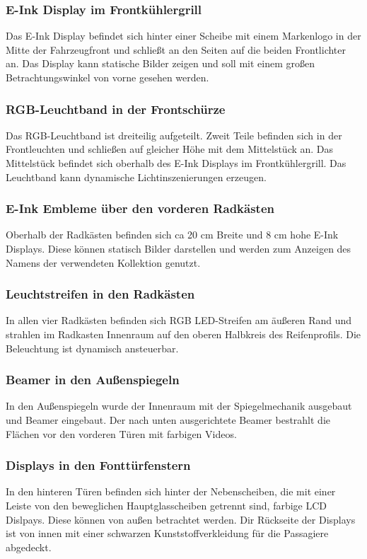 \subsubsection{E-Ink Display im Frontkühlergrill}
Das E-Ink Display befindet sich hinter einer Scheibe mit einem Markenlogo in der Mitte der Fahrzeugfront und schließt an den Seiten auf die beiden Frontlichter an. Das Display kann statische Bilder zeigen und soll mit einem großen Betrachtungswinkel von vorne gesehen werden.
\subsubsection{RGB-Leuchtband in der Frontschürze}
Das RGB-Leuchtband ist dreiteilig aufgeteilt. Zweit Teile befinden sich in der Frontleuchten und schließen auf gleicher Höhe mit dem Mittelstück an. Das Mittelstück befindet sich oberhalb des E-Ink Displays im Frontkühlergrill. Das Leuchtband kann dynamische Lichtinszenierungen erzeugen.
\subsubsection{E-Ink Embleme über den vorderen Radkästen}
Oberhalb der Radkästen befinden sich ca 20 cm Breite und 8 cm hohe E-Ink Displays. Diese können statisch Bilder darstellen und werden zum Anzeigen des Namens der verwendeten Kollektion genutzt.
\subsubsection{Leuchtstreifen in den Radkästen}
In allen vier Radkästen befinden sich RGB LED-Streifen am äußeren Rand und strahlen im Radkasten Innenraum auf den oberen Halbkreis des Reifenprofils. Die Beleuchtung ist dynamisch ansteuerbar.
\subsubsection{Beamer in den Außenspiegeln}
In den Außenspiegeln wurde der Innenraum mit der Spiegelmechanik ausgebaut und Beamer eingebaut. Der nach unten ausgerichtete Beamer bestrahlt die Flächen vor den vorderen Türen mit farbigen Videos.
\subsubsection{Displays in den Fonttürfenstern}
In den hinteren Türen befinden sich hinter der Nebenscheiben, die mit einer Leiste von den beweglichen Hauptglasscheiben getrennt sind, farbige LCD Dislpays. Diese können von außen betrachtet werden. Dir Rückseite der Displays ist von innen mit einer schwarzen Kunststoffverkleidung für die Passagiere abgedeckt.
